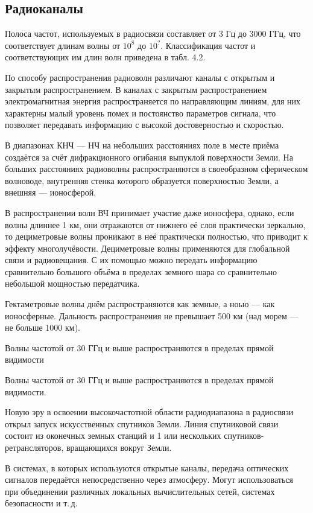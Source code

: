 \documentclass[
	a4paper,
	oneside,
	BCOR = 10mm,
	DIV = 12,
	12pt,
	headings = normal,
]{scrartcl}
\begin{document}
		\subsection{Радиоканалы}
			Полоса частот, используемых в радиосвязи составляет от 3 Гц до 3000 ГГц, что соответствует длинам волны от $10^{8}$ до $10^{?}$. Классификация частот и соответствующих им длин волн приведена в табл. 4.2.

			По способу распространения радиоволн различают каналы с открытым и закрытым распространением. В каналах с закрытым распространением электромагнитная энергия распространяется по направляющим линиям, для них характерны малый уровень помех и постоянство параметров сигнала, что позволяет передавать информацию с высокой достоверностью и скоростью.

			В диапазонах КНЧ — НЧ на небольших расстояниях поле в месте приёма создаётся за счёт дифракционного огибания выпуклой поверхности Земли. На больших расстояниях радиоволны распространяются в своеобразном сферическом волноводе, внутренняя стенка которого образуется поверхностью Земли, а внешняя — ионосферой.
			
			В распространении волн ВЧ принимает участие даже ионосфера, однако, если волны длиннее 1 км, они отражаются от нижнего её слоя практически зеркально, то дециметровые волны проникают в неё практически полностью, что приводит к эффекту многолучёвости. Дециметровые волны применяются для глобальной связи и радиовещания. С их помощью можно передать информацию сравнительно большого объёма в пределах земного шара со сравнительно небольшой мощностью передатчика.

			Гектаметровые волны днём распространяются как земные, а ноью — как ионосферные. Дальность распространения не превышает 500 км (над морем — не больше 1000 км).

			Волны частотой от 30 ГГц и выше распространяются в пределах прямой видимости

			Волны частотой от 30 ГГц и выше распространяются в пределах прямой видимости.

			Новую эру в освоении высокочастотной области радиодиапазона в радиосвязи открыл запуск искусственных спутников Земли. Линия спутниковой связи состоит из оконечных земных станций и 1 или нескольких спутников-ретрансляторов, вращающихся вокруг Земли. 

			В системах, в которых используются открытые каналы, передача оптических сигналов передаётся непосредственно через атмосферу. Могут использоваться при объединении различных локальных вычислительных сетей, системах безопасности и т.\,д.
\end{document}
